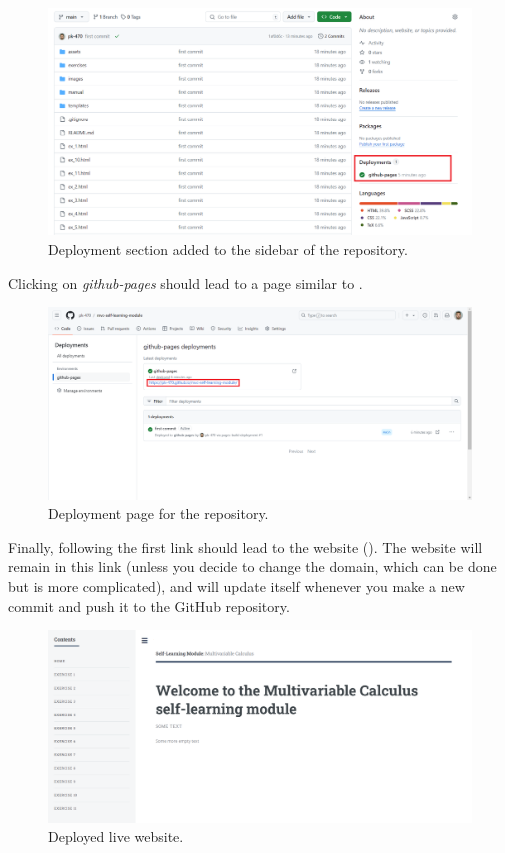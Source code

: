 \documentclass[a4paper,10pt]{article}
\begin{document}
\begin{figure}[htbp]
    \centering
    \includegraphics[width=\textwidth]{mvc_deployment_added.png}
    \caption{Deployment section added to the sidebar of the repository.}
    \label{fig:mvc_deployment_added}   
\end{figure}

Clicking on \emph{github-pages} should lead to a page similar to .

\begin{figure}[htbp]
    \centering
    \includegraphics[width=\textwidth]{deployment.png}
    \caption{Deployment page for the repository.}
    \label{fig:deployment}   
\end{figure}

Finally, following the first link should lead to the website (). The website will remain in this link (unless you decide to change the domain, which can be done but is more complicated), and will update itself whenever you make a new commit and push it to the GitHub repository.

\begin{figure}[htbp]
    \centering
    \includegraphics[width=\textwidth]{website.png}
    \caption{Deployed live website.}
    \label{fig:website}   
\end{figure}
\end{document}
